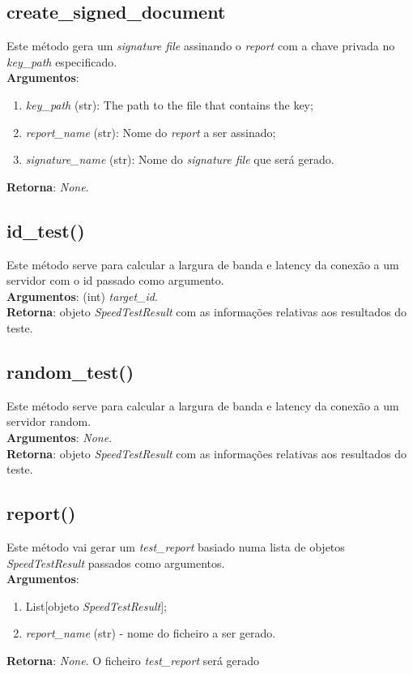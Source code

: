\documentclass{report}
\begin{document}
\subsection{create\_signed\_document}
\label{subsec.signDoc}
Este método gera um \textit{signature file} assinando o \textit{report} com a chave privada no \textit{key\_path} especificado.\\ 
\textbf{Argumentos}: 
\begin{enumerate}
\item \textit{key\_path} (str): The path to the file that contains the key;
\item \textit{report\_name} (str): Nome do \textit{report} a ser assinado;
\item \textit{signature\_name} (str): Nome do \textit{signature file} que será gerado.	
\end{enumerate}
\textbf{Retorna}: \textit{None}.

\subsection{id\_test()}
\label{subsec.idtest}
Este método serve para calcular a largura de banda e latency da conexão a um servidor com o id passado como argumento.\\ 
\textbf{Argumentos}: (int) \textit{target\_id}.\\
\textbf{Retorna}: objeto \textit{SpeedTestResult} com as informações relativas aos resultados do teste.

\subsection{random\_test()}
\label{subsec.randt}
Este método serve para calcular a largura de banda e latency da conexão a um servidor random.\\ 
\textbf{Argumentos}: \textit{None}.\\
\textbf{Retorna}: objeto \textit{SpeedTestResult} com as informações relativas aos resultados do teste.

\subsection{report()}
\label{subsec.report}
Este método vai gerar um \textit{test\_report} basiado numa lista de objetos \textit{SpeedTestResult} passados como argumentos.\\ 
\textbf{Argumentos}:
\begin{enumerate}
\item List[objeto \textit{SpeedTestResult}];
\item \textit{report\_name} (str) - nome do ficheiro a ser gerado.
\end{enumerate}
\textbf{Retorna}: \textit{None}. O ficheiro \textit{test\_report} será gerado
\end{document}
